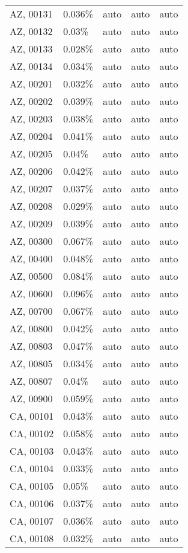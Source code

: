 \begin{longtable}[]{@{}lllll@{}}
AZ, 00131 & 0.036\% & auto & auto & auto \\
AZ, 00132 & 0.03\% & auto & auto & auto \\
AZ, 00133 & 0.028\% & auto & auto & auto \\
AZ, 00134 & 0.034\% & auto & auto & auto \\
AZ, 00201 & 0.032\% & auto & auto & auto \\
AZ, 00202 & 0.039\% & auto & auto & auto \\
AZ, 00203 & 0.038\% & auto & auto & auto \\
AZ, 00204 & 0.041\% & auto & auto & auto \\
AZ, 00205 & 0.04\% & auto & auto & auto \\
AZ, 00206 & 0.042\% & auto & auto & auto \\
AZ, 00207 & 0.037\% & auto & auto & auto \\
AZ, 00208 & 0.029\% & auto & auto & auto \\
AZ, 00209 & 0.039\% & auto & auto & auto \\
AZ, 00300 & 0.067\% & auto & auto & auto \\
AZ, 00400 & 0.048\% & auto & auto & auto \\
AZ, 00500 & 0.084\% & auto & auto & auto \\
AZ, 00600 & 0.096\% & auto & auto & auto \\
AZ, 00700 & 0.067\% & auto & auto & auto \\
AZ, 00800 & 0.042\% & auto & auto & auto \\
AZ, 00803 & 0.047\% & auto & auto & auto \\
AZ, 00805 & 0.034\% & auto & auto & auto \\
AZ, 00807 & 0.04\% & auto & auto & auto \\
AZ, 00900 & 0.059\% & auto & auto & auto \\
CA, 00101 & 0.043\% & auto & auto & auto \\
CA, 00102 & 0.058\% & auto & auto & auto \\
CA, 00103 & 0.043\% & auto & auto & auto \\
CA, 00104 & 0.033\% & auto & auto & auto \\
CA, 00105 & 0.05\% & auto & auto & auto \\
CA, 00106 & 0.037\% & auto & auto & auto \\
CA, 00107 & 0.036\% & auto & auto & auto \\
CA, 00108 & 0.032\% & auto & auto & auto \\

\end{longtable}
